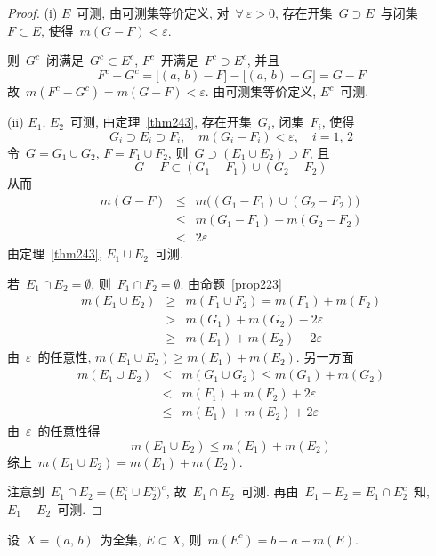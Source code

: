 \begin{proof}
(i) $E$~可测, 由可测集等价定义, 对~$\forall~\varepsilon > 0$,
存在开集~$G \supset E$~与闭集~$F \subset E$, 使得~$m(G-F) < \varepsilon$.

则~$G^c$~闭满足~$G^c \subset E^c$, $F^c$~开满足~$F^c \supset E^c$, 并且
\[
F^c - G^c = \big[(a,\,b)-F\big] - \big[(a,\,b)-G\big] = G - F
\]
故~$m(F^c - G^c) = m(G - F) < \varepsilon$. 由可测集等价定义, $E^c$~可测.

(ii) $E_1,\,E_2$~可测, 由定理~\ref{thm243}, 存在开集~$G_i$, 闭集~$F_i$, 使得
\[
G_i \supset E_i \supset F_i, \quad m(G_i - F_i) < \varepsilon, \quad i = 1,\,2
\]
令~$G = G_1 \cup G_2,\,F = F_1 \cup F_2$, 则~$G \supset (E_1 \cup E_2) \supset F$, 且
\[
G-F \subset (G_1 - F_1) \cup (G_2 - F_2)
\]
从而
\begin{eqnarray*}
m(G-F) &\leqslant& m\big( (G_1 - F_1) \cup (G_2 - F_2) \big) \\
&\leqslant& m(G_1 - F_1) + m(G_2 - F_2) \\
&<& 2 \varepsilon
\end{eqnarray*}
由定理~\ref{thm243}, $E_1 \cup E_2$~可测.

若~$E_1 \cap E_2 = \emptyset$, 则~$F_1 \cap F_2 = \emptyset$. 由命题~\ref{prop223}
\begin{eqnarray*}
m(E_1 \cup E_2) &\geqslant& m(F_1 \cup F_2) = m(F_1) + m(F_2) \\
&>& m(G_1) + m(G_2) - 2 \varepsilon \\
&\geqslant& m(E_1) + m(E_2) - 2 \varepsilon
\end{eqnarray*}
由~$\varepsilon$~的任意性, $m(E_1 \cup E_2) \geqslant m(E_1) + m(E_2)$. 另一方面
\begin{eqnarray*}
m(E_1 \cup E_2) &\leqslant& m(G_1 \cup G_2) \leqslant m(G_1) + m(G_2) \\
&<& m(F_1) + m(F_2) + 2 \varepsilon \\
&\leqslant& m(E_1) + m(E_2) + 2 \varepsilon
\end{eqnarray*}
由~$\varepsilon$~的任意性得
\[
m(E_1 \cup E_2) \leqslant m(E_1) + m(E_2)
\]
综上~$m(E_1 \cup E_2) = m(E_1) + m(E_2)$.

注意到~$E_1 \cap E_2 = \big(E_1^c \cup E_2^c\big)^c$, 故~$E_1 \cap E_2$~可测.
再由~$E_1 - E_2 = E_1 \cap E_2^c$~知, $E_1 - E_2$~可测.
\end{proof}

\begin{remark} \label{rem242}
设~$X = (a,\,b)$~为全集, $E \subset X$, 则~$m(E^c) = b-a - m(E)$.
\end{remark}

